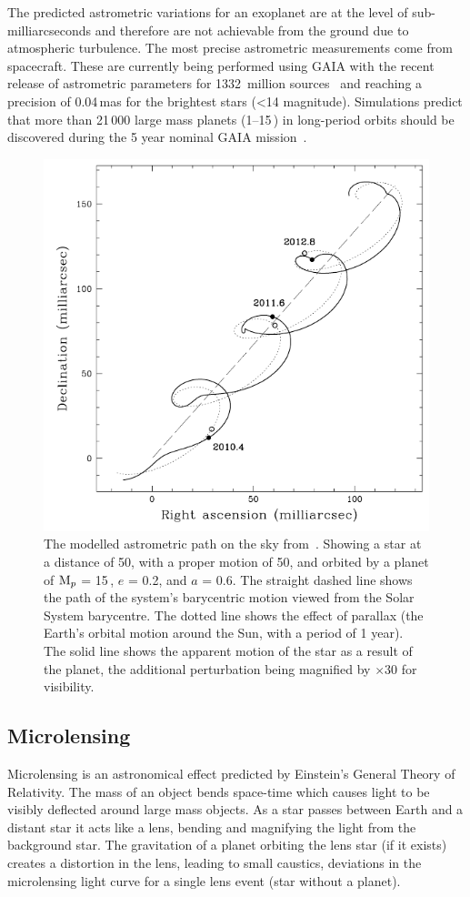 The predicted astrometric variations for an exoplanet are at the level of sub-milliarcseconds and therefore are not achievable from the ground due to atmospheric turbulence.
The most precise astrometric measurements come from spacecraft.
These are currently being performed using GAIA with the recent release of astrometric parameters for 1332~million sources~\citep{collaboration_gaia_2018} and reaching a precision of 0.04\,mas for the brightest stars (<14 magnitude).
Simulations predict that more than 21\,000 large mass planets (1--15\,\Mjup) in long-period orbits should be discovered during the 5 year nominal GAIA mission~\citep{perryman_astrometric_2014}.

\begin{figure}
    \centering
    \includegraphics[width=0.5\linewidth]{./figures/introduction/Astrometry_Perryman2000.png}
    \caption[Modelled astrometric path on the sky.]{The modelled astrometric path on the sky from~\citet{perryman_extrasolar_2000}.
    Showing a star at a distance of 50\pc, with a proper motion of 50\masperyr{}, and orbited by a planet of $\textrm{M}_{p}$ = 15\,\Mjup{}, $e$ = 0.2, and $a$ = 0.6\AU{}.
    The straight dashed line shows the path of the system's barycentric motion viewed from the Solar System barycentre.
    The dotted line shows the effect of parallax (the Earth's orbital motion around the Sun, with a period of 1 year).
    The solid line shows the apparent motion of the star as a result of the planet, the additional perturbation being magnified by $\times 30$ for visibility.}
    \label{fig:astrometry_perryman}
\end{figure}


\subsection{Microlensing}
\label{subsec:microlensing}
Microlensing is an astronomical effect predicted by Einstein's General Theory of Relativity.
The mass of an object bends space-time which causes light to be visibly deflected around large mass objects.
As a star passes between Earth and a distant star it acts like a lens, bending and magnifying the light from the background star.
The gravitation of a planet orbiting the lens star (if it exists) creates a distortion in the lens, leading to small caustics, deviations in the microlensing light curve for a single lens event (star without a planet).

